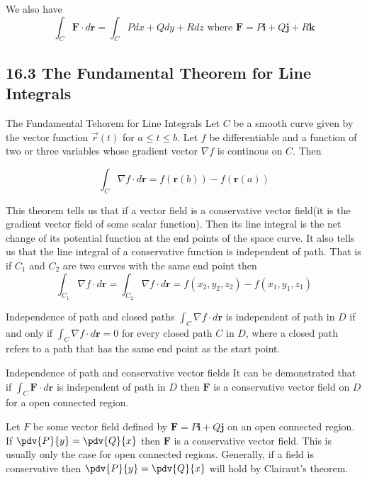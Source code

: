 \documentclass{article}
\begin{document}
	We also have
	\[
		\int_{C} \bm{F}\cdot d\bm{r}= \int_{C} Pdx + Qdy + Rdz \text{ where }\bm{F}=
		P\bm{i}+ Q\bm{j}+ R\bm{k}
	\]

	\subsection{16.3 The Fundamental Theorem for Line Integrals}

	\begin{mybox}
		{The Fundamental Tehorem for Line Integrals} Let $C$ be a smooth curve given
		by the vector function $\vec{r}(t)$ for $a \leq t \leq b$. Let $f$ be
		differentiable and a function of two or three variables whose gradient
		vector $\nabla f$ is continous on $C$. Then

		\[
			\int_{C} \nabla f \cdot d\bm{r}= f(\bm{r}(b))- f(\bm{r}(a))
		\]
	\end{mybox}

	This theorem tells us that if a vector field is a conservative vector field(it
	is the gradient vector field of some scalar function). Then its line integral is
	the net change of its potential function at the end points of the space curve.
	It also tells us that the line integral of a conservative function is
	independent of path. That is if $C_{1}$ and $C_{2}$ are two curves with the same
	end point then
	\[
		\int_{C_1}\nabla f \cdot d\bm{r}= \int_{C_2}\nabla f \cdot d\bm{r}= f(x_{2},y
		_{2},z_{2}) - f(x_{1},y_{1},z_{1})
	\]

	\begin{mybox}
		{Independence of path and closed paths} $\int_{C}\nabla f \cdot d\bm{r}$ is independent
		of path in $D$ if and only if $\int_{C}\nabla f \cdot d\bm{r}= 0$ for every closed
		path $C$ in $D$, where a closed path refers to a path that has the same end
		point as the start point.
	\end{mybox}

	\begin{mybox}
		{Independence of path and conservative vector fields} It can be demonstrated
		that if $\int_{C}\bm{F}\cdot d\bm{r}$ is independent of path in $D$ then $\bm
		{F}$ is a conservative vector field on $D$ for a open connected region.
	\end{mybox}

	Let $F$ be some vector field defined by $\bm{F}= P\bm{i}+ Q\bm{j}$ on an open
	connected region. If $\pdv{P}{y}= \pdv{Q}{x}$ then $\bm{F}$ is a conservative vector
	field. This is usually only the case for open connected regions. Generally, if
	a field is conservative then $\pdv{P}{y}= \pdv{Q}{x}$ will hold by Clairaut's
	theorem.
\end{document}
